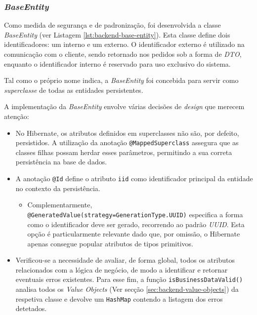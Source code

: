 \subsubsection{\textit{BaseEntity}}
\label{sec:backend-base-entity}

Como medida de segurança e de padronização, foi desenvolvida a classe \textit{BaseEntity} (ver Listagem \ref{lst:backend-base-entity}). Esta classe define dois identificadores: um interno e um externo. O identificador externo é utilizado na comunicação com o cliente, sendo retornado nos pedidos sob a forma de \textit{DTO}, enquanto o identificador interno é reservado para uso exclusivo do sistema.

Tal como o próprio nome indica, a \textit{BaseEntity} foi concebida para servir como \textit{superclasse} de todas as entidades persistentes.

A implementação da \textit{BaseEntity} envolve várias decisões de \textit{design} que merecem atenção:

\begin{itemize}
    \item No \gls{Hibernate}, os atributos definidos em superclasses não são, por defeito, persistidos. A utilização da anotação \lstinline|@MappedSuperclass| assegura que as classes filhas possam herdar esses parâmetros, permitindo a sua correta persistência na base de dados.

    \item A anotação \lstinline|@Id| define o atributo \lstinline|iid| como identificador principal da entidade no contexto da persistência. 
    
    \begin{itemize}
        \item Complementarmente, \lstinline|@GeneratedValue(strategy=GenerationType.UUID)| especifica a forma como o identificador deve ser gerado, recorrendo ao padrão \textit{UUID}. Esta opção é particularmente relevante dado que, por omissão, o \gls{Hibernate} apenas consegue popular atributos de tipos primitivos.
    \end{itemize}
    
    \item Verificou-se a necessidade de avaliar, de forma global, todos os atributos relacionados com a lógica de negócio, de modo a identificar e retornar eventuais erros existentes. Para esse fim, a função \lstinline|isBusinessDataValid()| analisa todos os \textit{Value Objects} (Ver secção \ref{sec:backend-value-objects}) da respetiva classe e devolve um \lstinline|HashMap| contendo a listagem dos erros detetados.
\end{itemize}

